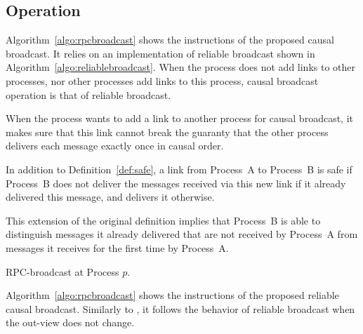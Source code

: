 

\subsection{Operation}

Algorithm~\ref{algo:rpcbroadcast} shows the instructions of the proposed causal
broadcast. It relies on an implementation of reliable broadcast shown in
Algorithm~\ref{algo:reliablebroadcast}. When the process does not add links to
other processes, nor other processes add links to this process, causal broadcast
operation is that of reliable broadcast.

When the process wants to add a link to another process for causal broadcast, it
makes sure that this link cannot break the guaranty that the other process
delivers each message exactly once in causal order.


\begin{definition}
  In addition to Definition~\ref{def:safe}, a link from Process~A to Process~B
  is safe if Process~B does not deliver the messages received via this new link
  if it already delivered this message, and delivers it otherwise.
\end{definition}

This extension of the original definition implies that Process~B is able to
distinguish messages it already delivered that are not received by Process~A
from messages it receives for the first time by Process~A.

\begin{algorithm}[h]
  
  \caption{\label{algo:rpcbroadcast}RPC-broadcast at Process $p$.}
\end{algorithm}

Algorithm~\ref{algo:rpcbroadcast} shows the instructions of the proposed
reliable causal broadcast. Similarly to \PCBROADCAST, it follows the behavior of
reliable broadcast when the out-view does not change. 

